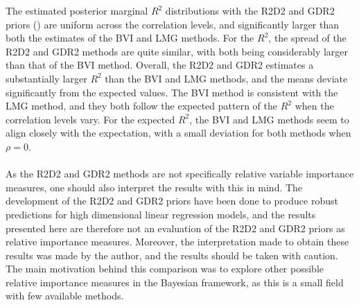 \noindent The estimated posterior marginal $R^2$ distributions with the R2D2 and GDR2 priors () are uniform across the correlation levels, and significantly larger than both the estimates of the BVI and LMG methods. For the $R^2$, the spread of the R2D2 and GDR2 methods are quite similar, with both being considerably larger than that of the BVI method. Overall, the R2D2 and GDR2 estimates a substantially larger $R^2$ than the BVI and LMG methods, and the means deviate significantly from the expected values. The BVI method is consistent with the LMG method, and they both follow the expected pattern of the $R^2$ when the correlation levels vary. For the expected $R^2$, the BVI and LMG methods seem to align closely with the expectation, with a small deviation for both methods when $\rho=0$.
\\
\\
As the R2D2 and GDR2 methods are not specifically relative variable importance measures, one should also interpret the results with this in mind. The development of the R2D2 and GDR2 priors have been done to produce robust predictions for high dimensional linear regression models, and the results presented here are therefore not an evaluation of the R2D2 and GDR2 priors as relative importance measures. Moreover, the interpretation made to obtain these results was made by the author, and the results should be taken with caution. The main motivation behind this comparison was to explore other possible relative importance measures in the Bayesian framework, as this is a small field with few available methods. 




